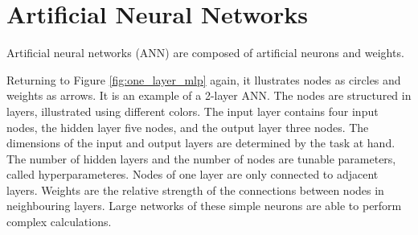 \documentclass{article}
\begin{document}
\section{Artificial Neural Networks} \label{sec:artificial neural networks}
Artificial neural networks (ANN) are composed of artificial neurons and weights.  

Returning to Figure \ref{fig:one_layer_mlp} again, it llustrates nodes as circles and weights as arrows. It is an example of a 2-layer ANN. The nodes are structured in layers, illustrated using different colors. The input layer contains four input nodes, the hidden layer five nodes, and the output layer three nodes. The dimensions of the input and output layers are determined by the task at hand. The number of hidden layers and the number of nodes are tunable parameters, called hyperparameteres. Nodes of one layer are only connected to adjacent layers. Weights are the relative strength of the connections between nodes in neighbouring layers. %
Large networks of these simple neurons are able to perform complex calculations. 

\end{document}
